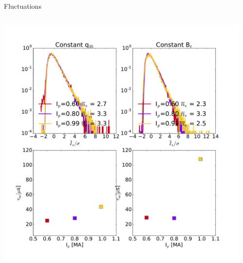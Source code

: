 \documentclass[10pt, compress]{beamer}
\begin{document}
\begin{frame}{Fluctuations}
  \begin{columns}
\begin{column}{0.5\textwidth}
    \includegraphics[width=\textwidth]{../../Experiments/AUG/analysis/pdfbox/ScalingAutoCorrelation}
  \end{column}
\begin{column}{0.5\textwidth}
\end{column}
\end{columns}
\end{frame}
\end{document}
